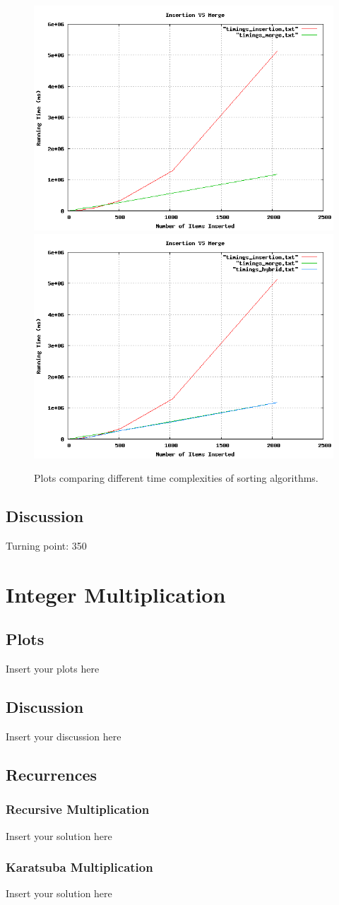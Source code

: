 \documentclass[a4paper]{article}
\begin{document}
\begin{figure}[h]

\includegraphics[width=0.48\linewidth]{Insertion_VS_Merge.png}
\includegraphics[width=0.48\linewidth]{Complete_Analysis.png}

\caption{Plots comparing different time complexities of sorting algorithms.}
\label{fig:examples}
\end{figure}

\subsection{Discussion}

Turning point: 350

\section{Integer Multiplication}

\subsection{Plots}

\noindent Insert your plots here

\subsection{Discussion}

\noindent Insert your discussion here

\subsection{Recurrences}

\subsubsection{Recursive Multiplication}

\noindent Insert your solution here

\subsubsection{Karatsuba Multiplication}

\noindent Insert your solution here
\end{document}
